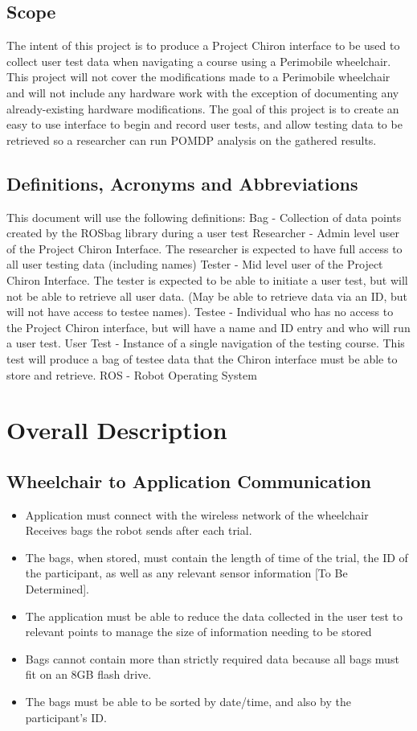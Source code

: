 \documentclass[onecolumn, draftclsnofoot,10pt, compsoc]{IEEEtran}
\begin{document}
\subsection{Scope}
The intent of this project is to produce a Project Chiron interface to be used to collect user test data when navigating a course using a Perimobile wheelchair. This project will not cover the modifications made to a Perimobile wheelchair and will not include any hardware work with the exception of documenting any already-existing hardware modifications. The goal of this project is to create an easy to use interface to begin and record user tests, and allow testing data to be retrieved so a researcher can run POMDP analysis on the gathered results.
\subsection{Definitions, Acronyms and Abbreviations}
This document will use the following definitions:
Bag - Collection of data points created by the ROSbag library during a user test
Researcher - Admin level user of the Project Chiron Interface. The researcher is expected to have full access to all user testing data (including names)
Tester - Mid level user of the Project Chiron Interface. The tester is expected to be able to initiate a user test, but will not be able to retrieve all user data. (May be able to retrieve data via an ID, but will not have access to testee names).
Testee - Individual who has no access to the Project Chiron interface, but will have a name and ID entry and who will run a user test.
User Test - Instance of a single navigation of the testing course. This test will produce a bag of testee data that the Chiron interface must be able to store and retrieve.
ROS - Robot Operating System
\section{Overall Description}
\subsection{Wheelchair to Application Communication}
\begin{itemize}
	\item Application must connect with the wireless network of the wheelchair 
	\subitem Receives bags the robot sends after each trial.
	\item The bags, when stored, must contain the length of time of the trial, the ID of the participant, as well as any relevant sensor information [To Be Determined].
	\item The application must be able to reduce the data collected in the user test to relevant points to manage the size of information needing to be stored
	\item Bags cannot contain more than strictly required data because all bags must fit on an 8GB flash drive.
	\item The bags must be able to be sorted by date/time, and also by the participant's ID.
\end{itemize}
\end{document}
